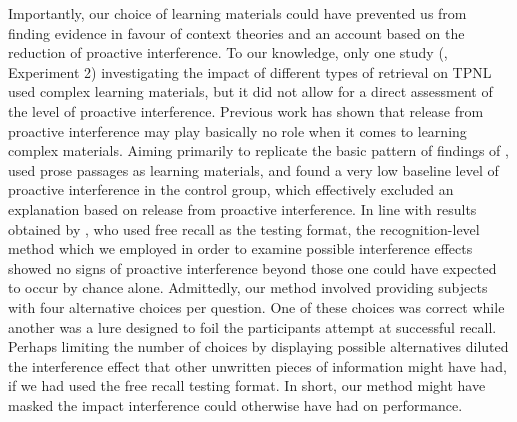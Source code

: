 \documentclass[../main.tex]{subfiles}
\begin{document}
Importantly, our choice of learning materials could have prevented us from 
finding evidence in favour of context theories and an account based on the 
reduction of proactive interference. To our knowledge, only one study 
(\citealp{divisRetrievalSpeedsContext2014}, Experiment 2) investigating the 
impact of different types of retrieval on TPNL used complex learning 
materials, but it did not allow for a direct assessment of the level of 
proactive interference. Previous work has shown that release from proactive
interference may play basically no role when it comes to learning complex
materials. Aiming primarily to replicate the basic pattern of findings of 
\cite{szpunarTestingStudyInsulates2008}, \cite{wissmanInterimTestEffect2011} 
used prose passages as learning materials, and found a very low baseline level 
of proactive interference in the control group, which effectively excluded
an explanation based on release from proactive interference. In line with 
results obtained by \cite{wissmanInterimTestEffect2011}, who used free recall 
as the testing format, the recognition-level method which we employed in order 
to examine possible interference effects showed no signs of proactive 
interference beyond those one could have expected to occur by chance alone. 
Admittedly, our method involved providing subjects with four alternative 
choices per question. One of these choices was correct while another was a lure 
designed to foil the participants attempt at successful recall. Perhaps 
limiting the number of choices by displaying possible alternatives diluted the 
interference effect that other unwritten pieces of information might have had, 
if we had used the free recall testing format. In short, our method might have 
masked the impact interference could otherwise have had on performance.
\end{document}

